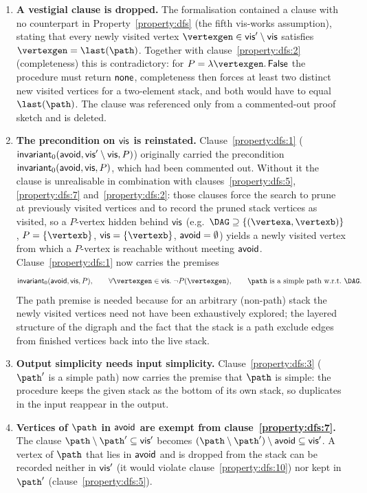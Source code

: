\begin{enumerate}
\item \textbf{A vestigial clause is dropped.}  The formalisation contained a clause with
  no counterpart in Property~\ref{property:dfs} (the fifth vis-works assumption), stating
  that every newly visited vertex $\vertexgen\in\vis'\setminus\vis$ satisfies
  $\vertexgen = \last(\path)$.  Together with clause~\ref{property:dfs:2}
  (completeness) this is contradictory: for $P = \lambda\vertexgen.\,\mathsf{False}$ the
  procedure must return $\textsf{\upshape none}$, completeness then forces at least two distinct new
  visited vertices for a two-element stack, and both would have to equal $\last(\path)$.
  The clause was referenced only from a commented-out proof sketch and is deleted.

\item \textbf{The precondition on $\textsf{\upshape vis}$ is reinstated.}  Clause~\ref{property:dfs:1}
  ($\textsf{\upshape invariant}_0(\textsf{\upshape avoid},\textsf{\upshape vis}'\setminus\textsf{\upshape vis},P)$) originally carried the precondition
  $\textsf{\upshape invariant}_0(\textsf{\upshape avoid},\textsf{\upshape vis},P)$, which had been commented out.  Without it the clause is
  unrealisable in combination with clauses~\ref{property:dfs:5}, \ref{property:dfs:7}
  and~\ref{property:dfs:2}: those clauses force the search to prune at previously visited
  vertices and to record the pruned stack vertices as visited, so a $P$-vertex hidden
  behind $\textsf{\upshape vis}$ (e.g.\ $\digraph\supseteq\{(\vertexa,\vertexb)\}$, $P=\{\vertexb\}$,
  $\vis=\{\vertexb\}$, $\textsf{\upshape avoid}=\emptyset$) yields a newly visited vertex from which a
  $P$-vertex is reachable without meeting $\textsf{\upshape avoid}$.  Clause~\ref{property:dfs:1} now
  carries the premises
  \[
    \invariant_0(\avoid,\vis,P), \qquad
    \forall\vertexgen\in\vis.\;\neg P(\vertexgen), \qquad
    \text{$\path$ is a simple path w.r.t.\ $\digraph$.}
  \]
  The path premise is needed because for an arbitrary (non-path) stack the newly visited
  vertices need not have been exhaustively explored; the layered structure of the digraph
  and the fact that the stack is a path exclude edges from finished vertices back into
  the live stack.

\item \textbf{Output simplicity needs input simplicity.}  Clause~\ref{property:dfs:3}
  ($\path'$ is a simple path) now carries the premise that $\path$ is simple: the
  procedure keeps the given stack as the bottom of its own stack, so duplicates in the
  input reappear in the output.

\item \textbf{Vertices of $\path$ in $\textsf{\upshape avoid}$ are exempt from clause~\ref{property:dfs:7}.}
  The clause $\path\setminus\path'\subseteq\vis'$ becomes
  $(\path\setminus\path')\setminus\avoid\subseteq\vis'$.  A vertex of $\path$ that lies in
  $\textsf{\upshape avoid}$ and is dropped from the stack can be recorded neither in $\textsf{\upshape vis}'$ (it would
  violate clause~\ref{property:dfs:10}) nor kept in $\path'$
  (clause~\ref{property:dfs:5}).
\end{enumerate}


